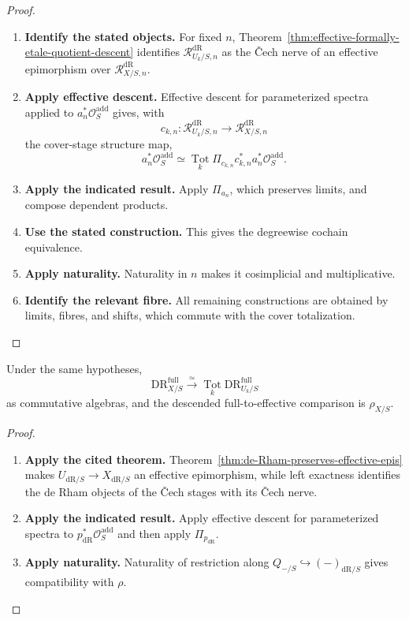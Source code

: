 \begin{proof}
\leavevmode
\begin{enumerate}[label=\textup{(\arabic*)}]
    \item \textbf{Identify the stated objects.}
    For fixed \(n\), Theorem~\ref{thm:effective-formally-etale-quotient-descent}
    identifies \(\mathcal R^{\mathrm{dR}}_{U_k/S,n}\) as the \v{C}ech nerve of an
    effective epimorphism over \(\mathcal R^{\mathrm{dR}}_{X/S,n}\).
    \item \textbf{Apply effective descent.}
    Effective descent
    for parameterized spectra applied to
    \(a_n^*\mathcal O_S^{\mathrm{add}}\) gives, with
    \[
    c_{k,n}:\mathcal R^{\mathrm{dR}}_{U_k/S,n}
    \longrightarrow
    \mathcal R^{\mathrm{dR}}_{X/S,n}
    \]
    the cover-stage structure map,
    \[
    a_n^*\mathcal O_S^{\mathrm{add}}
    \simeq
    \operatorname*{Tot}_k
    \Pi_{c_{k,n}}c_{k,n}^*a_n^*\mathcal O_S^{\mathrm{add}}.
    \]
    \item \textbf{Apply the indicated result.}
    Apply \(\Pi_{a_n}\), which preserves limits, and compose dependent products.
    \item \textbf{Use the stated construction.}
    This
    gives the degreewise cochain equivalence.
    \item \textbf{Apply naturality.}
    Naturality in \(n\) makes it
    cosimplicial and multiplicative.
    \item \textbf{Identify the relevant fibre.}
    All remaining constructions are obtained by
    limits, fibres, and shifts, which commute with the cover totalization.
\end{enumerate}
\end{proof}

\begin{theorem}
\label{thm:effective-descent-full-de-Rham}
Under the same hypotheses,
\[
  \mathrm{DR}^{\mathrm{full}}_{X/S}
  \xrightarrow{\simeq}
  \operatorname*{Tot}_k
  \mathrm{DR}^{\mathrm{full}}_{U_k/S}
\]
as commutative algebras, and the descended full-to-effective comparison is
\(\rho_{X/S}\).
\end{theorem}

\begin{proof}
\leavevmode
\begin{enumerate}[label=\textup{(\arabic*)}]
    \item \textbf{Apply the cited theorem.}
    Theorem~\ref{thm:de-Rham-preserves-effective-epis} makes
    \(U_{\mathrm{dR}/S}\to X_{\mathrm{dR}/S}\) an effective epimorphism, while left exactness
    identifies the de Rham objects of the \v{C}ech stages with its \v{C}ech nerve.
    \item \textbf{Apply the indicated result.}
    Apply effective descent for parameterized spectra to
    \(p_{\mathrm{dR}}^*\mathcal O_S^{\mathrm{add}}\) and then apply
    \(\Pi_{p_{\mathrm{dR}}}\).
    \item \textbf{Apply naturality.}
    Naturality of restriction along
    \(Q_{-/S}\hookrightarrow(-)_{\mathrm{dR}/S}\) gives compatibility with \(\rho\).
\end{enumerate}
\end{proof}

